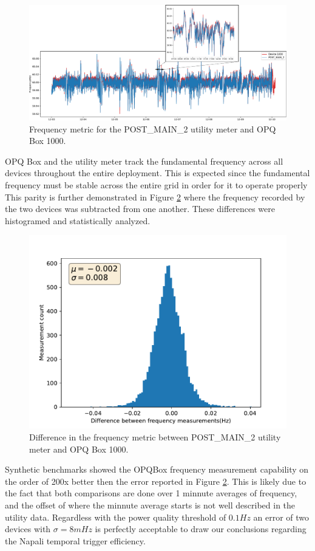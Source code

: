 \begin{figure}[ht!]
    \centering
    \includegraphics[width=1\linewidth]{img/napali_eval/gt/gt_frequency.pdf}
    \caption{Frequency metric for the POST\_MAIN\_2 utility meter and OPQ Box 1000.}
    \label{expdes:fig:postmain2:freq}
\end{figure}

OPQ Box and the utility meter track the fundamental frequency across all devices throughout the entire deployment.
This is expected since the fundamental frequency must be stable across the entire grid in order for it to operate properly
This parity is further demonstrated in Figure \ref{expdes:fig:postmain2:freq_diff} where the frequency recorded by the two devices was subtracted from one another.
These differences were histogramed and statistically analyzed.

\begin{figure}[ht!]
    \centering
    \includegraphics[width=0.6\linewidth]{img/napali_eval/gt/gt_f_diff.pdf}
    \caption{Difference in the frequency metric between POST\_MAIN\_2 utility meter and OPQ Box 1000.}
    \label{expdes:fig:postmain2:freq_diff}
\end{figure}

Synthetic benchmarks showed the OPQBox frequency measurement capability on the order of 200x better then the error reported in Figure \ref{expdes:fig:postmain2:freq_diff}.
This is likely due to the fact that both comparisons are done over 1 minnute averages of frequency, and the offset of where the minnute average starts is not well described in the utility data.
Regardless with the power quality threshold of $0.1Hz$ an error of two devices with $\sigma=8mHz$ is perfectly acceptable to draw our conclusions regarding the Napali temporal trigger efficiency.

